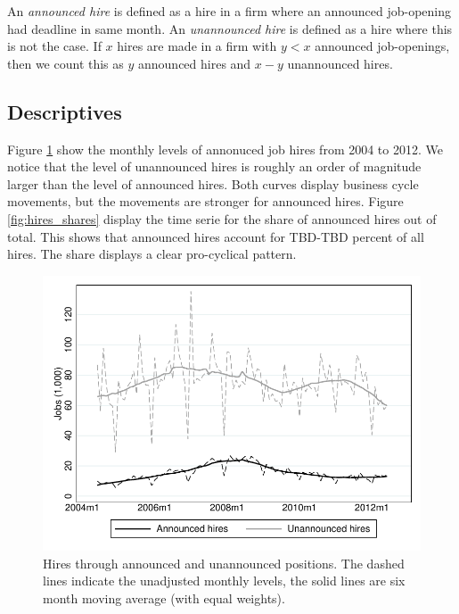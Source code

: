 \documentclass[11pt,article]{memoir}
\begin{document}
An \emph{announced hire} is defined as a hire in a firm where an announced job-opening had deadline in same month. An \emph{unannounced hire} is defined as a hire where this is not the case. If $x$ hires are made in a firm with $y<x$ announced job-openings, then we count this as $y$ announced hires and $x-y$ unannounced hires. 

\subsection{Descriptives}

Figure \ref{fig:hires} show the monthly levels of annonuced job hires from 2004 to 2012. We notice that the level of unannounced hires is roughly an order of magnitude larger than the level of announced hires. Both curves display business cycle movements, but the movements are stronger for announced hires. Figure \ref{fig:hires_shares} display the time serie for the share of announced hires out of total. This shows that announced hires account for TBD-TBD percent of all hires. The share displays a clear pro-cyclical pattern.

\begin{figure}[h]
\begin{center}
		\includegraphics[width=.98\linewidth]{figures/overview_full}
	\caption{Hires through announced and unannounced positions. The dashed lines indicate the unadjusted monthly levels, the solid lines are six month moving average (with equal weights). }
	\label{fig:hires}
\end{center}
\end{figure}
\end{document}
